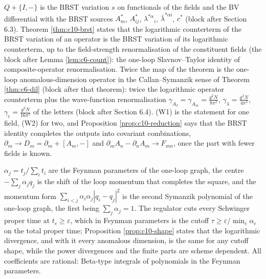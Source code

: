 \begin{remark}
$Q+\{I,-\}$ is the BRST variation $s$ on functionals of the fields and the BV differential with the BRST sources $A^*_m$, $A^*_{ij}$, $\lambda^{*\alpha}{}_i$, $\bar\lambda^{*\dot\alpha i}$, $c^*$ (block after Section 6.3). Theorem \ref{thm:c10-brst} states that the logarithmic counterterm of the BRST variation of an operator is the BRST variation of its logarithmic counterterm, up to the field-strength renormalisation of the constituent fields (the block after Lemma \ref{lem:c6-count}): the one-loop Slavnov--Taylor identity of composite-operator renormalisation. Twice the map of the theorem is the one-loop anomalous-dimension operator in the Callan--Symanzik sense of Theorem \ref{thm:c6-dil} (block after that theorem): twice the logarithmic operator counterterm plus the wave-function renormalisation $\gamma_{A_I}=\gamma_{A_m}=\frac{g^2N}{8\pi^2}$, $\gamma_\lambda=\frac{g^2N}{4\pi^2}$, $\gamma_c=\frac{g^2N}{16\pi^2}$ of the letters (block after Section 6.4). (W1) is the statement for one field, (W2) for two, and Proposition \ref{prop:c10-reduction} says that the BRST identity completes the outputs into covariant combinations, $\partial_m\to D_m=\partial_m+[A_m,-]$ and $\partial_mA_n-\partial_nA_m\to F_{mn}$, once the part with fewer fields is known.
\end{remark}

\begin{remark}
$\alpha_j=t_j/\sum_it_i$ are the Feynman parameters of the one-loop graph, the centre $-\sum_j\alpha_jq_j$ is the shift of the loop momentum that completes the square, and the momentum form $\sum_{i<j}\alpha_i\alpha_j|q_i-q_j|^2$ is the second Symanzik polynomial of the one-loop graph, the first being $\sum_j\alpha_j=1$. The regulator cuts every Schwinger proper time at $t_e\ge\varepsilon$, which in Feynman parameters is the cutoff $\tau\ge\varepsilon/\min_e\alpha_e$ on the total proper time; Proposition \ref{prop:c10-shape} states that the logarithmic divergence, and with it every anomalous dimension, is the same for any cutoff shape, while the power divergences and the finite parts are scheme dependent. All coefficients are rational: Beta-type integrals of polynomials in the Feynman parameters.
\end{remark}

